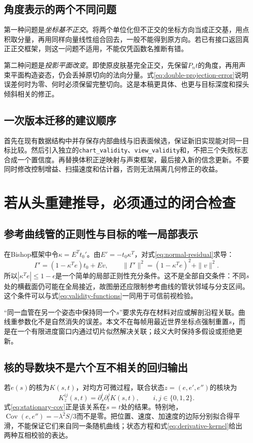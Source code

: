 \documentclass[UTF8,11pt,a4paper,fontset=fandol]{ctexart}
\numberwithin{equation}{section}
\theoremstyle{plain}
\theoremstyle{definition}
\theoremstyle{remark}
\DeclareMathOperator{\Cov}{Cov}\DeclareMathOperator{\Var}{Var}
\begin{document}
\subsection{角度表示的两个不同问题}
第一种问题是\emph{坐标基不正交}。将两个单位化但不正交的坐标方向当成正交基，用点积取分量，再用同样向量线性组合回去，一般不能得到原方向。若已有接口返回真正正交框架，则这一问题不适用，不能仅凭函数名推断有错。

第二种问题是\emph{投影平面改变}。即使原皮肤基完全正交，先保留$P_nt$的角度，再用声束平面构造姿态，仍会丢掉原切向的法向分量。式\eqref{eq:double-projection-error}说明误差何时为零、何时必须保留完整切向。这是本稿更具体、也更与目标深度和探头倾斜相关的修正。

\subsection{一次版本迁移的建议顺序}
首先在现有数据结构中并存保存内部曲线与旧表面候选，保证新旧实现能对同一目标比较。然后引入独立的\texttt{chart\_validity}、\texttt{view\_validity}和，不把三个失败标志合成一个置信度。再替换体积正逆映射与声束框架，最后接入新的信念更新。不要同时修改控制增益、扫描速度和估计器，否则无法隔离几何修正的收益。

\section{若从头重建推导，必须通过的闭合检查}\label{app:derivations}
\subsection{参考曲线管的正则性与目标的唯一局部表示}
在Bishop框架中令$\kappa=E^Tt_0'$。由$E'=-t_0\kappa^T$，对式\eqref{eq:normal-residual}求导：
\begin{equation}
 \Gamma'=(1-\kappa^Te)t_0+Ev,
 \qquad
 \|\Gamma'\|^2=(1-\kappa^Te)^2+\|v\|^2.
 \label{eq:target-regularity}
\end{equation}
所以$|\kappa^Te|\leq1-\epsilon$是一个简单的局部正则性充分条件。这不是全部自交条件：不同$s$处的横截面仍可能在全局接近，故图册还应限制参考曲线的管状邻域与分支区间。这个条件可以与式\eqref{eq:validity-functions}一同用于可信前视检验。

“同一血管在另一个姿态中保持同一个$s$”要求先存在材料对应或解剖沿程关联。曲线重参数化不是自然消失的误差。本文不在每帧用最近世界坐标点强制重置$s$，而是在一个有限进度窗口内通过切片似然解决关联；歧义大时保持多假设或拒绝更新。

\subsection{核的导数块不是六个互不相关的回归输出}
若$e(s)$的核为$K(s,t)$，对均方可微过程，联合状态$z=(e,e',e'')$的核块为
\begin{equation}
 K_z^{ij}(s,t)=\partial_s^i\partial_t^jK(s,t),
 \qquad i,j\in\{0,1,2\}.
 \label{eq:derivative-kernel}
\end{equation}
式\eqref{eq:stationary-cov}正是该关系在$s=t$处的结果。特别地，$\Cov(e,e'')=-\lambda^2S/3$而不是零。把位置、速度、加速度的边际分别拟合得平滑，不能保证它们来自同一条随机曲线；状态方程和式\eqref{eq:derivative-kernel}给出两种互相校验的表达。
\end{document}

